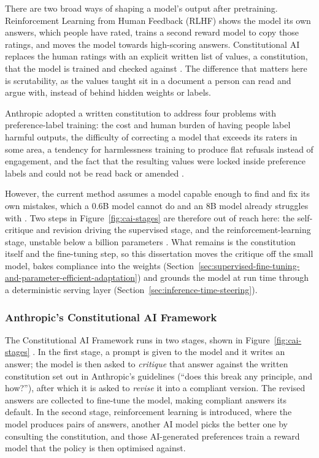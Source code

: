There are two broad ways of shaping a model's output after pretraining. Reinforcement Learning from Human Feedback (RLHF) shows the model its own answers, which people have rated, trains a second reward model to copy those ratings, and moves the model towards high-scoring answers. Constitutional AI replaces the human ratings with an explicit written list of values, a constitution, that the model is trained and checked against \cite{bai2022constitutionalaiharmlessnessai}. The difference that matters here is scrutability, as the values taught sit in a document a person can read and argue with, instead of behind hidden weights or labels.

Anthropic adopted a written constitution to address four problems with preference-label training: the cost and human burden of having people label harmful outputs, the difficulty of correcting a model that exceeds its raters in some area, a tendency for harmlessness training to produce flat refusals instead of engagement, and the fact that the resulting values were locked inside preference labels and could not be read back or amended \cite{bai2022constitutionalaiharmlessnessai}. 

However, the current method assumes a model capable enough to find and fix its own mistakes, which a 0.6B model cannot do and an 8B model already struggles with \cite{zhang2025constitutioncollapseexploringconstitutional}. Two steps in Figure~\ref{fig:cai-stages} are therefore out of reach here: the self-critique and revision driving the supervised stage, and the reinforcement-learning stage, unstable below a billion parameters \cite{wang2025ragenunderstandingselfevolutionllm}. What remains is the constitution itself and the fine-tuning step, so this dissertation moves the critique off the small model, bakes compliance into the weights (Section~\ref{sec:supervised-fine-tuning-and-parameter-efficient-adaptation}) and grounds the model at run time through a deterministic serving layer (Section~\ref{sec:inference-time-steering}).

\subsubsection{Anthropic's Constitutional AI Framework}
\label{subsec:anthropics-constitutional-ai-framework}

The Constitutional AI Framework runs in two stages, shown in Figure~\ref{fig:cai-stages} \cite{bai2022constitutionalaiharmlessnessai}. In the first stage, a prompt is given to the model and it writes an answer; the model is then asked to \emph{critique} that answer against the written constitution set out in Anthropic's guidelines (``does this break any principle, and how?''), after which it is asked to \emph{revise} it into a compliant version. The revised answers are collected to fine-tune the model, making compliant answers its default. In the second stage, reinforcement learning is introduced, where the model produces pairs of answers, another AI model picks the better one by consulting the constitution, and those AI-generated preferences train a reward model that the policy is then optimised against.

